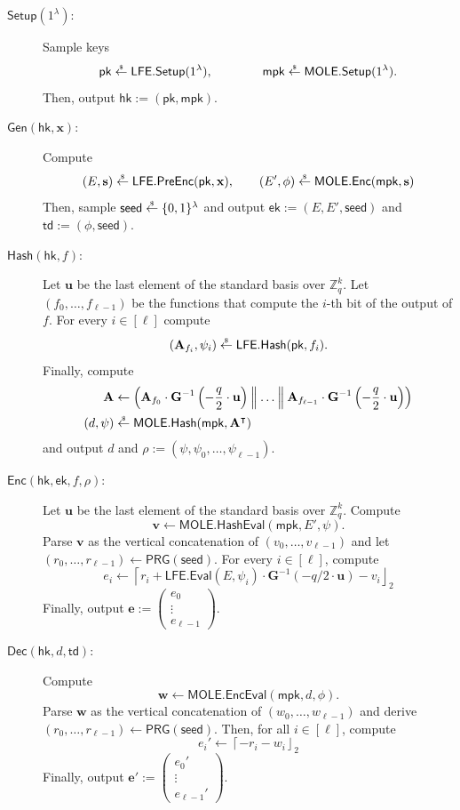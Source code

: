 \documentclass{theoretics}
\newcommand{\ek}{\mathsf{ek}}
\newcommand{\td}{\mathsf{td}}
\newcommand{\LFE}{\mathsf{LFE}}
\newcommand{\MOLE}{\mathsf{MOLE}}
\newcommand{\getsr}{\overset{\raisebox{-1pt}{$\scriptscriptstyle \$$}}{\gets}}
\newcommand{\sample}{\getsr}
\newcommand{\Pre}{\mathsf{Pre}}
\newcommand{\Z}{\mathbb{Z}}
\renewcommand{\sec}{\ensuremath{\lambda}}
\newcommand{\secpar}{\sec}
\newcommand{\algofont}[1]{\ensuremath{\mathsf{#1}}}
\newcommand{\Enc}{{\algofont{Enc}}}
\newcommand{\Dec}{{\algofont{Dec}}}
\newcommand{\Setup}{{\algofont{Setup}}}
\newcommand{\Gen}{{\algofont{Gen}}}
\newcommand{\Eval}{\algofont{Eval}\xspace}
\newcommand{\Hash}{{\algofont{Hash}}}
\newcommand{\mpk}{\mathsf{mpk}}
\newcommand{\pk}{{\mathsf{pk}}}
\newcommand{\hk}{\ensuremath{\mathsf{hk}}}
\newcommand\bbbone{1}
\newenvironment{protocol}[1][]
{\begin{algorithm}\caption{#1}}
  {\end{algorithm}}
\begin{document}
\begin{protocol}[Reverse Trapdoor Hash]\label{prot:RTDH}
\setlength{\abovedisplayskip}{4pt}\setlength{\belowdisplayskip}{4pt}
\setlength{\belowdisplayshortskip}{4pt}


\begin{description}
\item[$\Setup(1^\secpar)$:] Sample keys
\[\pk \sample \LFE.\Setup(\bbbone^\sec), \qquad\qquad \mpk \sample \MOLE.\Setup(\bbbone^\sec).\]
Then, output $\hk:=(\pk, \mpk)$.

\item[$\Gen(\hk, \mathbf{x})$:] Compute
\[(E, \mathbf{s}) \sample \LFE.\Pre\Enc(\pk, \mathbf{x}), \qquad (E', \phi) \sample \MOLE.\Enc(\mpk, \mathbf{s})\]
{Then, sample $\mathsf{seed}\sample\{0, 1\}^\sec$ and output $\ek:=(E, E', \mathsf{seed})$ and $\td:=(\phi, \mathsf{seed})$.}



\item[$\Hash(\hk, f)$:] Let $\mathbf{u}$ be the last element of the standard basis over $\Z_q^k$. Let $(f_0, \dots, f_{\ell-1})$ be the functions that compute the $i$-th bit of the output of $f$. For every $i\in[\ell]$ compute
\[(\mathbf{A}_{f_i}, \psi_i)\sample\LFE.\Hash(\pk, f_i).\]
Finally, compute
\begin{align*}\mathbf{A}&\gets \left(\mathbf{A}_{f_0}\cdot \mathbf{G}^{-1}\left(-\frac{q}{2}\cdot \mathbf{u}\right)\mathbin{\Big\|}\dots \mathbin{\Big\|}\mathbf{A}_{f_{\ell-1}}\cdot \mathbf{G}^{-1}\left(-\frac{q}{2}\cdot \mathbf{u}\right)\right)\\
(d, \psi) &\sample \MOLE.\Hash(\mpk, \mathbf{A}^\intercal)\end{align*}
and output $d$ and $\rho:=(\psi, \psi_0, \dots, \psi_{\ell-1})$.


\item[$\Enc(\hk, \ek, f, \rho)$:] Let $\mathbf{u}$ be the last element of the standard basis over $\Z_q^k$. Compute
\[\mathbf{v}\gets \MOLE.\Hash\Eval(\mpk, E', \psi).\]
Parse $\mathbf{v}$ as the vertical concatenation of $(v_0, \dots, v_{\ell-1})$ 
and let $(r_0, \dots, r_{\ell-1})\gets \mathsf{PRG}(\mathsf{seed})$. For every $i\in[\ell]$, compute
\[e_i \gets \left\lceil r_i + \LFE.\Eval(E, \psi_i)\cdot  \mathbf{G}^{-1}(-q/2\cdot \mathbf{u}) - v_i \right\rfloor_2\]
Finally, output $\mathbf{e}:= \begin{pmatrix}
  e_0 \\ \vdots\\ e_{\ell-1}  
\end{pmatrix}$.
\item[$\Dec(\hk, d, \td)$:] Compute
\[\mathbf{w}\gets\MOLE.\Enc\Eval(\mpk, d, \phi).\]
 Parse $\mathbf{w}$ as the vertical concatenation of $(w_0, \dots, w_{\ell-1})$ 
and derive $(r_0, \dots, r_{\ell-1})\gets \mathsf{PRG}(\mathsf{seed})$. Then, for all $i\in[\ell]$, compute
\[e_i' \gets \left\lceil - r_i -w_i\right\rfloor_2\]
Finally, output $\mathbf{e}':=\begin{pmatrix}e_0'\\ \vdots\\ e_{\ell-1}'\end{pmatrix}$.
\end{description}
\end{protocol}
\end{document}
